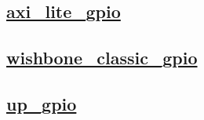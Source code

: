 \documentclass{article}
\begin{document}
  


  \subsection{\href{../files/axi_lite_gpio-v.html}{axi\_lite\_gpio}}

  \subsection{\href{../files/wishbone_classic_gpio-v.html}{wishbone\_classic\_gpio}}

  \subsection{\href{../files/up_gpio-v.html}{up\_gpio}}
\end{document}
